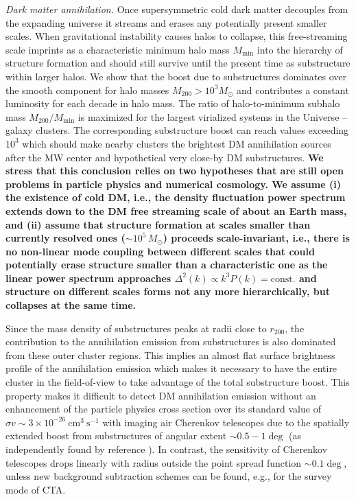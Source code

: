 \documentclass[10pt,aps,pra,reprint,amsmath,amsfonts,amssymb,showpacs,nofootinbib,floatfix]{revtex4-1}
\def\C#1{{\bf #1}}
\newcommand{\rmn}{\mathrm}
\newcommand{\msun}{M_\odot}
\newcommand{\rvir}{r_{200}}
\newcommand{\mvir}{M_{200}}
\begin{document}
{\em Dark matter annihilation.} Once supersymmetric cold dark matter decouples
from the expanding universe it streams and erases any potentially present
smaller scales. When gravitational instability causes halos to collapse, this
free-streaming scale imprints as a characteristic minimum halo mass
$M_\mathrm{min}$ into the hierarchy of structure formation and should still
survive until the present time as substructure within larger halos. We show that
the boost due to substructures dominates over the smooth component for halo
masses $\mvir>10^3 \msun$ and contributes a constant luminosity for each decade
in halo mass. The ratio of halo-to-minimum subhalo mass $\mvir/M_\mathrm{min}$
is maximized for the largest virialized systems in the Universe -- galaxy
clusters. The corresponding substructure boost can reach values exceeding $10^3$
which should make nearby clusters the brightest DM annihilation sources after
the MW center and hypothetical very close-by DM substructures. \C{We stress that
  this conclusion relies on two hypotheses that are still open problems in
  particle physics and numerical cosmology. We assume (i) the existence of cold
  DM, i.e., the density fluctuation power spectrum extends down to the DM free
  streaming scale of about an Earth mass, and (ii) assume that structure
  formation at scales smaller than currently resolved ones ($\sim 10^5\,\msun$)
  proceeds scale-invariant, i.e., there is no non-linear mode coupling between
  different scales that could potentially erase structure smaller than a
  characteristic one as the linear power spectrum approaches $\Delta^2(k)
  \propto k^3 P(k)=\rmn{const.}$ and structure on different scales forms not any
  more hierarchically, but collapses at the same time.}

Since the mass density of substructures peaks at radii close to
$\rvir$, the contribution to the annihilation emission from
substructures is also dominated from these outer cluster regions.
This implies an almost flat surface brightness profile of the
annihilation emission which makes it necessary to have the entire
cluster in the field-of-view to take advantage of the total
substructure boost. This property makes it difficult to detect DM
annihilation emission without an enhancement of the particle physics
cross section over its standard value of $\sigma v\sim 3\times
10^{-26} ~\mathrm{cm}^3~\mathrm{s}^{-1}$ with imaging air Cherenkov
telescopes due to the spatially extended boost from substructures of
angular extent $\sim 0.5-1\deg$ (as independently found by reference
\cite{2011arXiv1104.3530S}). In contrast, the sensitivity of Cherenkov
telescopes drops linearly with radius outside the point spread
function $\sim 0.1\deg$, unless new background subtraction schemes can
be found, e.g., for the survey mode of CTA.
\end{document}
